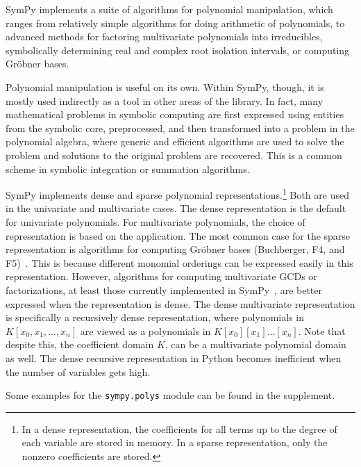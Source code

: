 
SymPy implements a suite of algorithms for polynomial manipulation,
which ranges from relatively simple algorithms for doing arithmetic of
polynomials, to advanced methods for factoring multivariate polynomials
into irreducibles, symbolically determining real and complex root isolation
intervals, or computing Gr\"{o}bner bases.

Polynomial manipulation is useful on its own. Within SymPy, though, it is mostly used
indirectly as a tool in other areas of the library. In fact, many mathematical
problems in symbolic computing are first expressed using entities from the
symbolic core, preprocessed, and then transformed into a problem in the
polynomial algebra, where generic and efficient algorithms are used to solve
the problem and solutions to the original problem are recovered.
This is a common scheme in symbolic integration or summation algorithms.

SymPy implements dense and sparse polynomial representations.\footnote{In a
dense representation, the coefficients for all terms up to the degree of each
variable are stored in memory. In a sparse representation, only the nonzero
coefficients are stored.} Both are used in the univariate and multivariate
cases. The dense representation is the default for univariate polynomials. For
multivariate polynomials, the choice of representation is based on the
application. The most common case for the sparse representation is algorithms
for computing Gr\"{o}bner bases (Buchberger, F4, and
F5)~\cite{Buchberger1965thesis,Faugere1999f4,Faugere2002f5}. This is because
different monomial orderings can be expressed easily in this representation.
However, algorithms for computing multivariate GCDs or factorizations, at
least those currently implemented in SymPy~\cite{paprocki2010thesis},
are better expressed when the representation is dense. The dense multivariate
representation is specifically a recursively dense representation, where
polynomials in $K[x_0, x_1, \dotsc, x_n]$ are viewed as a polynomials in
$K[x_0][x_1]\dotso[x_n]$. Note that despite this, the coefficient domain $K$,
can be a multivariate polynomial domain as well. The dense recursive
representation in Python becomes inefficient when the number of variables gets
high.

Some examples for the \texttt{sympy.polys} module can be found in the
supplement.
